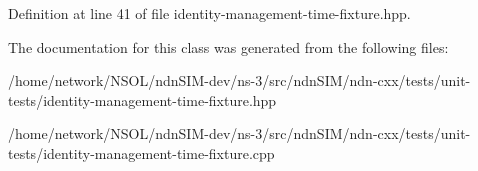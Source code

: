 Definition at line 41 of file identity-\/management-\/time-\/fixture.\+hpp.



The documentation for this class was generated from the following files\+:\begin{DoxyCompactItemize}
\item 
/home/network/\+N\+S\+O\+L/ndn\+S\+I\+M-\/dev/ns-\/3/src/ndn\+S\+I\+M/ndn-\/cxx/tests/unit-\/tests/identity-\/management-\/time-\/fixture.\+hpp\item 
/home/network/\+N\+S\+O\+L/ndn\+S\+I\+M-\/dev/ns-\/3/src/ndn\+S\+I\+M/ndn-\/cxx/tests/unit-\/tests/identity-\/management-\/time-\/fixture.\+cpp\end{DoxyCompactItemize}
